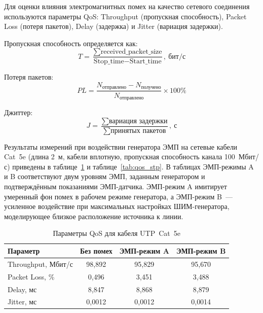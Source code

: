 
Для оценки влияния электромагнитных помех на качество
сетевого соединения используются параметры QoS:
Throughput (пропускная способность), Packet Loss (потеря пакетов),
Delay (задержка) и Jitter (вариация задержки).

Пропускная способность определяется как:
\begin{equation}
  T = \frac{\sum \text{received\_packet\_size}}{\text{Stop\_time} - \text{Start\_time}},~\text{бит/с}
\end{equation}

Потеря пакетов:
\begin{equation}
  PL = \frac{N_\text{отправлено} - N_\text{получено}}{N_\text{отправлено}} \times 100\%
\end{equation}

Джиттер:
\begin{equation}
  J = \frac{\sum \text{вариация задержки}}{\sum \text{принятых пакетов}},~\text{с}
\end{equation}

Результаты измерений при воздействии генератора ЭМП
на сетевые кабели Cat~5e (длина 2~м, кабели вплотную,
пропускная способность канала 100~Мбит/с)
приведены в таблице~\ref{tab:qos_utp} и таблице~\ref{tab:qos_stp}.
В таблицах ЭМП-режимы A и B соответствуют двум уровням ЭМП,
заданным генератором и подтверждённым показаниями ЭМП-датчика.
ЭМП-режим A имитирует умеренный фон помех в рабочем режиме генератора,
а ЭМП-режим B~--- усиленное воздействие при максимальных настройках
ШИМ-генератора, моделирующее близкое расположение источника к линии.

\begin{table}[H]
  \centering
  \caption{Параметры QoS для кабеля UTP~Cat~5e}
  \label{tab:qos_utp}
  \begin{tabular}{|l|c|c|c|}
    \hline
    \textbf{Параметр} & \textbf{Без помех} & \textbf{ЭМП-режим A} & \textbf{ЭМП-режим B} \\
    \hline
    Throughput, Мбит/с & 98{,}892 & 95{,}829 & 95{,}670 \\
    Packet Loss, \%    & 0{,}496  & 3{,}451  & 3{,}488  \\
    Delay, мс           & 8{,}847  & 8{,}868  & 8{,}879  \\
    Jitter, мс         & 0{,}0012 & 0{,}0012 & 0{,}0014 \\
    \hline
  \end{tabular}
\end{table}

